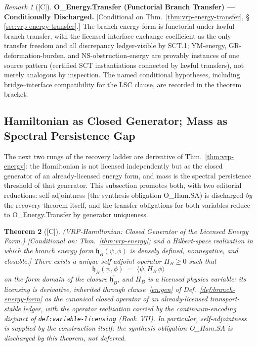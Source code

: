 \documentclass[12pt,oneside]{amsbook}
\theoremstyle{plain}
\newtheorem{theorem}{Theorem}[section]
\theoremstyle{definition}
\theoremstyle{remark}
\newtheorem{remark}[theorem]{Remark}
\newcommand{\status}[1]{\textup{[#1]}}
\begin{document}
\begin{remark}[\status{C}]\label{ob:vrp-energy-transfer}
\textbf{O\_Energy.Transfer (Functorial Branch Transfer) ---
Conditionally Discharged.}
\textup{[Conditional on Thm.~\ref{thm:vrp-energy-transfer},
\S\,\ref{sec:vrp-energy-transfer}.]}
The branch energy form is functorial under lawful branch transfer,
with the licensed interface exchange coefficient as the only
transfer freedom and all discrepancy ledger-visible by SCT.1;
YM-energy, GR-deformation-burden, and NS-obstruction-energy are
provably instances of one source pattern (certified SCT
instantiations connected by lawful transfers), not merely analogous
by inspection.  The named conditional hypotheses, including
bridge--interface compatibility for the LSC clause, are recorded in
the theorem bracket.
\end{remark}

\subsection{Hamiltonian as Closed Generator; Mass as Spectral
Persistence Gap}
\label{sec:vrp-hamiltonian-mass}

The next two rungs of the recovery ladder are derivative of
Thm.~\ref{thm:vrp-energy}: the Hamiltonian is not licensed
independently but as the closed generator of an already-licensed
energy form, and mass is the spectral persistence threshold of that
generator.  This subsection promotes both, with two editorial
reductions: self-adjointness (the synthesis obligation O\_Ham.SA)
is discharged \emph{by} the recovery theorem itself, and the
transfer obligations for both variables reduce to
O\_Energy.Transfer by generator uniqueness.

\begin{theorem}[\status{C}]\label{thm:vrp-hamiltonian}
\textup{(VRP-Hamiltonian: Closed Generator of the Licensed Energy
Form.)}
\textup{[Conditional on: Thm.~\ref{thm:vrp-energy}; and a
Hilbert-space realization in which the branch energy form
$\mathfrak{h}_B(\psi,\phi)$ is densely defined, nonnegative, and
closable.]}
There exists a unique self-adjoint operator $H_B \ge 0$ such that
\[
  \mathfrak{h}_B(\psi,\phi) \;=\; \langle \psi, H_B\,\phi
  \rangle
\]
on the form domain of the closure $\overline{\mathfrak{h}_B}$, and
$H_B$ is a licensed physics variable: its licensing is
\emph{derivative}, inherited through clause~\ref{en:gen} of
Def.~\ref{def:branch-energy-form} as the canonical closed operator
of an already-licensed transport-stable ledger, with the operator
realization carried by the continuum-encoding disjunct of
\texttt{def:variable-licensing} (Book~VII).  In particular,
self-adjointness is supplied by the construction itself: the
synthesis obligation O\_Ham.SA is discharged by this theorem, not
deferred.
\end{theorem}
\end{document}

